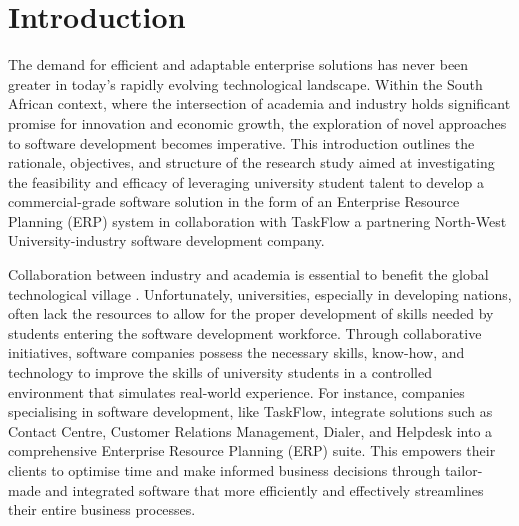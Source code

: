 \chapter{Introduction}
\par{The demand for efficient and adaptable enterprise solutions has never been greater in today's
rapidly evolving technological landscape. Within the South African context, where the
intersection of academia and industry holds significant promise for innovation and economic
growth, the exploration of novel approaches to software development becomes imperative. This
introduction outlines the rationale, objectives, and structure of the research study aimed at
investigating the feasibility and efficacy of leveraging university student talent to develop a
commercial-grade software solution in the form of an Enterprise Resource Planning (ERP)
system in collaboration with TaskFlow a partnering North-West University-industry software
development company.}

\par{Collaboration between industry and academia is essential to benefit the global technological
village \citep{baig2018bridging}. Unfortunately, universities, especially in developing nations, often lack the resources to allow for the proper development of skills needed by students entering the software development workforce. Through collaborative initiatives, software companies possess
the necessary skills, know-how, and technology to improve the skills of university students in a
controlled environment that simulates real-world experience. For instance, companies
specialising in software development, like TaskFlow, integrate solutions such as Contact Centre,
Customer Relations Management, Dialer, and Helpdesk into a comprehensive Enterprise
Resource Planning (ERP) suite. This empowers their clients to optimise time and make
informed business decisions through tailor-made and integrated software that more efficiently
and effectively streamlines their entire business processes.}

